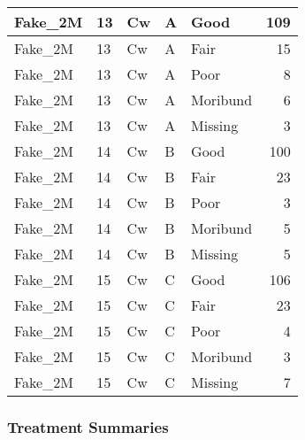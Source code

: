\documentclass[
]{article}
\begin{document}
\begin{tabular}{l|l|l|l|l|r}
\hline
Fake\_2M & 13 & Cw & A & Good & 109\\
\hline
Fake\_2M & 13 & Cw & A & Fair & 15\\
\hline
Fake\_2M & 13 & Cw & A & Poor & 8\\
\hline
Fake\_2M & 13 & Cw & A & Moribund & 6\\
\hline
Fake\_2M & 13 & Cw & A & Missing & 3\\
\hline
Fake\_2M & 14 & Cw & B & Good & 100\\
\hline
Fake\_2M & 14 & Cw & B & Fair & 23\\
\hline
Fake\_2M & 14 & Cw & B & Poor & 3\\
\hline
Fake\_2M & 14 & Cw & B & Moribund & 5\\
\hline
Fake\_2M & 14 & Cw & B & Missing & 5\\
\hline
Fake\_2M & 15 & Cw & C & Good & 106\\
\hline
Fake\_2M & 15 & Cw & C & Fair & 23\\
\hline
Fake\_2M & 15 & Cw & C & Poor & 4\\
\hline
Fake\_2M & 15 & Cw & C & Moribund & 3\\
\hline
Fake\_2M & 15 & Cw & C & Missing & 7\\
\hline
\end{tabular}

\hypertarget{treatment-summaries}{%
\subsubsection{Treatment Summaries}\label{treatment-summaries}}
\end{document}
